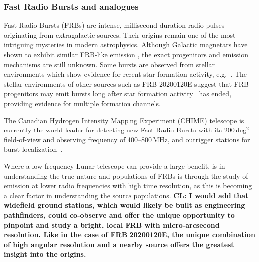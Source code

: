 

\subsubsection{Fast Radio Bursts and analogues}
Fast Radio Bursts (FRBs) are intense, millisecond-duration radio pulses originating from extragalactic sources. Their origins remain one of the most intriguing mysteries in modern astrophysics. Although Galactic magnetars have shown to exhibit similar FRB-like emission \citep{BC_2020,chime2020sgr1935}, the exact progenitors and emission mechanisms are still unknown. Some bursts are observed from stellar environments which show evidence for recent star formation activity, e.g.~\citet{piro2021}. The stellar environments of other sources such as FRB 20200120E suggest that FRB progenitors may emit bursts long after star formation activity~\citep{kirsten2022m81} has ended, providing evidence for multiple formation channels.

The Canadian Hydrogen Intensity Mapping Experiment (CHIME) telescope is currently the world leader for detecting new Fast Radio Bursts with its 200\,deg$^{2}$ field-of-view and observing frequency of 400--800\,MHz, and outrigger stations for burst localization~\citep{leung2021synoptic,lanman2024kko}. 

Where a low-frequency Lunar telescope can provide a large benefit, is in understanding the true nature and populations of FRBs is through the study of emission at lower radio frequencies with high time resolution, as this is becoming a clear factor in understanding the source populations. \textbf{CL: I would add that widefield ground stations, which would likely be built as engineering pathfinders, could co-observe and offer the unique opportunity to pinpoint and study a bright, local FRB with micro-arcsecond resolution. Like in the case of FRB 20200120E, the unique combination of high angular resolution and a nearby source offers the greatest insight into the origins.}

